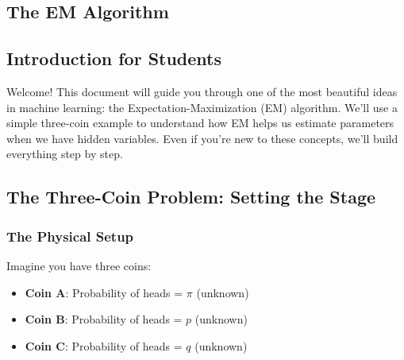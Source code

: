 \begin{notechapter}
\lstset{style=mystyle}
\chapter{The EM Algorithm}\label{ch:em-algorithm}

\section*{Introduction for Students}

Welcome! This document will guide you through one of the most beautiful ideas in machine learning: the Expectation-Maximization (EM) algorithm. We'll use a simple three-coin example to understand how EM helps us estimate parameters when we have hidden variables. Even if you're new to these concepts, we'll build everything step by step.

\section{The Three-Coin Problem: Setting the Stage}

\subsection{The Physical Setup}

Imagine you have three coins:
\begin{itemize}
    \item \textbf{Coin A}: Probability of heads = $\pi$ (unknown)
    \item \textbf{Coin B}: Probability of heads = $p$ (unknown)
    \item \textbf{Coin C}: Probability of heads = $q$ (unknown)
\end{itemize}


\end{notechapter}
